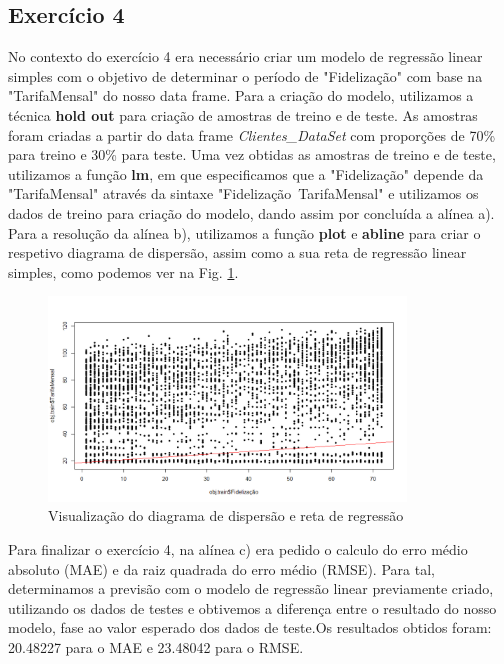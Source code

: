 \subsection{Exercício 4}
No contexto do exercício 4 era necessário criar um modelo de regressão linear simples com o objetivo de determinar o período de "Fidelização" com base na "TarifaMensal" do nosso data frame. Para a criação do modelo, utilizamos a técnica \textbf{hold out} para criação de amostras de treino e de teste. As amostras foram criadas a partir do data frame \textit{Clientes\_DataSet} com proporções de 70\% para treino e 30\% para teste. Uma vez obtidas as amostras de treino e de teste, utilizamos a função \textbf{lm}, em que especificamos que a "Fidelização" depende da "TarifaMensal" através da sintaxe "Fidelização~TarifaMensal" e utilizamos os dados de treino para criação do modelo, dando assim por concluída a alínea a). Para a resolução da alínea b), utilizamos a função \textbf{plot} e \textbf{abline} para criar o respetivo diagrama de dispersão, assim como a sua reta de regressão linear simples, como podemos ver na Fig. \ref{ex_4_b_regressao_simples}. 
\begin{figure}[htbp]
\centerline{\includegraphics[width=9.5cm]{images/ex_4_b_regressao_simples.png}}
\caption{Visualização do diagrama de dispersão e reta de regressão}
\label{ex_4_b_regressao_simples}
\end{figure}
Para finalizar o exercício 4, na alínea c) era pedido o calculo do erro médio absoluto (MAE) e da raiz quadrada do erro médio (RMSE). Para tal, determinamos a previsão com o modelo de regressão linear previamente criado, utilizando os dados de testes e obtivemos a diferença entre o resultado do nosso modelo, fase ao valor esperado dos dados de teste.Os resultados obtidos foram: 20.48227 para o MAE e 23.48042 para o RMSE.

